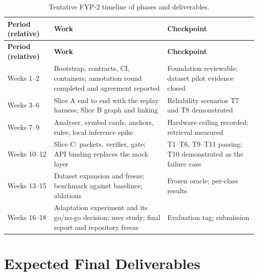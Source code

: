 \begin{longtable}{>{\raggedright\arraybackslash}p{} >{\raggedright\arraybackslash}p{} >{\raggedright\arraybackslash}p{}}
\caption{Tentative FYP-2 timeline of phases and deliverables.}\label{tab:timeline}\\
\hline\textbf{Period (relative)} & \textbf{Work} & \textbf{Checkpoint} \\
\hline\endfirsthead
\hline\textbf{Period (relative)} & \textbf{Work} & \textbf{Checkpoint} \\
\hline\endhead
Weeks 1--2 & Bootstrap, contracts, CI, containers; annotation round completed
  and agreement reported & Foundation reviewable; dataset pilot evidence closed \\
Weeks 3--6 & Slice A end to end with the replay harness; Slice B graph and
  linking & Reliability scenarios T7 and T8 demonstrated \\
Weeks 7--9 & Analyser, symbol cards, anchors, rules; local inference spike &
  Hardware ceiling recorded; retrieval measured \\
Weeks 10--12 & Slice C: packets, verifier, gate; API binding replaces the mock
  layer & T1--T6, T9--T11 passing; T10 demonstrated as the failure case \\
Weeks 13--15 & Dataset expansion and freeze; benchmark against baselines;
  ablations & Frozen oracle; per-class results \\
Weeks 16--18 & Adaptation experiment and its go/no-go decision; user study;
  final report and repository freeze & Evaluation tag; submission \\
\hline\end{longtable}

\section{Expected Final Deliverables}
\label{sec:deliverables}

